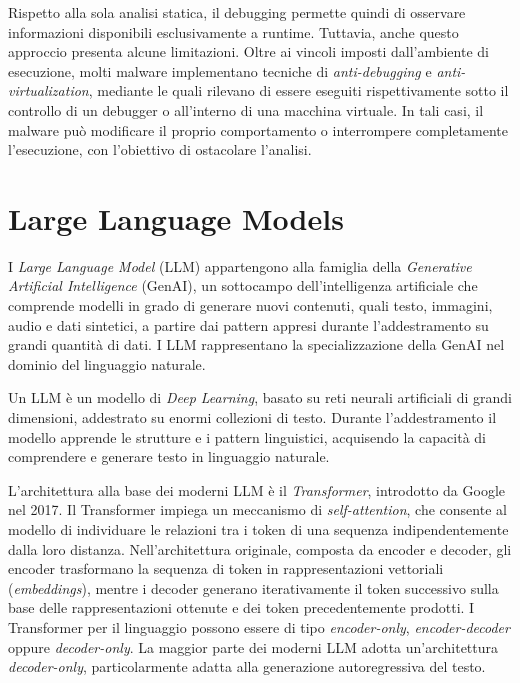 Rispetto alla sola analisi statica, il debugging permette quindi di osservare informazioni disponibili esclusivamente a runtime. Tuttavia, anche questo approccio presenta alcune limitazioni. Oltre ai vincoli imposti dall'ambiente di esecuzione, molti malware implementano tecniche di \textit{anti-debugging} e \textit{anti-virtualization}, mediante le quali rilevano di essere eseguiti rispettivamente sotto il controllo di un debugger o all'interno di una macchina virtuale. In tali casi, il malware può modificare il proprio comportamento o interrompere completamente l'esecuzione, con l'obiettivo di ostacolare l'analisi.

\section{Large Language Models} %

I \textit{Large Language Model} (LLM) appartengono alla famiglia della \textit{Generative Artificial Intelligence} (GenAI), un sottocampo dell'intelligenza artificiale che comprende modelli in grado di generare nuovi contenuti, quali testo, immagini, audio e dati sintetici, a partire dai pattern appresi durante l'addestramento su grandi quantità di dati. I LLM rappresentano la specializzazione della GenAI nel dominio del linguaggio naturale.

Un LLM è un modello di \textit{Deep Learning}, basato su reti neurali artificiali di grandi dimensioni, addestrato su enormi collezioni di testo. Durante l'addestramento il modello apprende le strutture e i pattern linguistici, acquisendo la capacità di comprendere e generare testo in linguaggio naturale.


L'architettura alla base dei moderni LLM è il \textit{Transformer}, introdotto da Google nel 2017. Il Transformer impiega un meccanismo di \textit{self-attention}, che consente al modello di individuare le relazioni tra i token di una sequenza indipendentemente dalla loro distanza. Nell'architettura originale, composta da encoder e decoder, gli encoder trasformano la sequenza di token in rappresentazioni vettoriali (\textit{embeddings}), mentre i decoder generano iterativamente il token successivo sulla base delle rappresentazioni ottenute e dei token precedentemente prodotti. I Transformer per il linguaggio possono essere di tipo \textit{encoder-only}, \textit{encoder-decoder} oppure \textit{decoder-only}. La maggior parte dei moderni LLM adotta un'architettura \textit{decoder-only}, particolarmente adatta alla generazione autoregressiva del testo. \cite{dhamani2026genai} %


